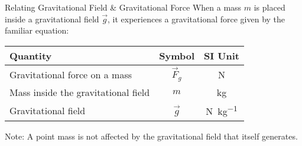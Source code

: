 \documentclass[12pt,compress,aspectratio=169]{beamer}
\begin{document}
\begin{frame}{Relating Gravitational Field \& Gravitational Force}
  When a mass $m$ is placed inside a gravitational field $\vec g$, it
  experiences a gravitational force given by the familiar equation:

  \begin{center}
    \begin{tabular}{l|c|c}
      \rowcolor{pink}
      \textbf{Quantity} & \textbf{Symbol} & \textbf{SI Unit} \\ \hline
      Gravitational force on a mass & $\vec F_g$ & \si\newton \\
      Mass inside the gravitational field & $m$ & \si{\kilo\gram}\\
      Gravitational field & $\vec g$   & \si{\newton\per\kilogram}
    \end{tabular}
  \end{center}
  Note: A point mass is not affected by the gravitational field that itself
  generates.
\end{frame}
\end{document}
